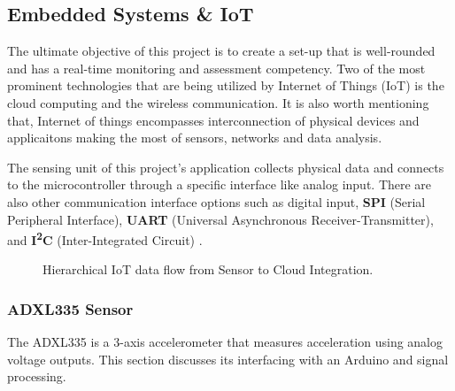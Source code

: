 \subsection{Embedded Systems \& IoT} 
{
The ultimate objective of this project is to create a set-up that is well-rounded and has a real-time monitoring and assessment competency. Two of the most prominent technologies that are being utilized by Internet of Things (IoT) is the cloud computing and the wireless communication. It is also worth mentioning that, Internet of things encompasses interconnection of physical devices and applicaitons making the most of sensors, networks and data analysis. 

The sensing unit of this project's application collects physical data and connects to the microcontroller through a specific interface like analog input. There are also other communication interface options such as digital input, \textbf{SPI} (Serial Peripheral Interface), \textbf{UART} (Universal Asynchronous Receiver-Transmitter), and \textbf{I\textsuperscript{2}C} (Inter-Integrated Circuit) \cite{Dharmarathne2025}.

\begin{figure}[h]
    \centering
    \caption{Hierarchical IoT data flow from Sensor to Cloud Integration.}
    \label{fig:IoTHierarchy}
\end{figure}
}
 
\subsubsection{ADXL335 Sensor}  
The ADXL335 is a 3-axis accelerometer that measures acceleration using analog voltage outputs. This section discusses its interfacing with an Arduino and signal processing.  


